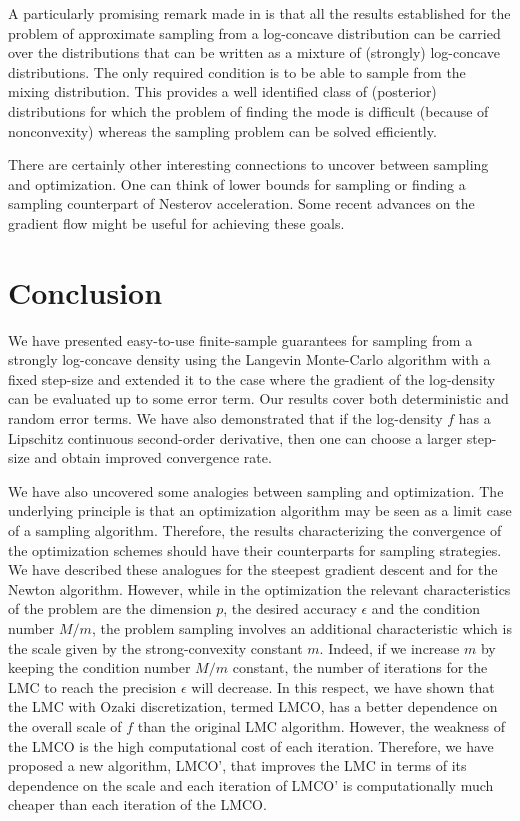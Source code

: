 \documentclass[aoap,preprint,reqno,a4paper]{imsart} %
\newcommand{\eps}{\epsilon}
\begin{document}
A particularly promising remark made in  is that all the results
established for the problem of approximate sampling from a log-concave distribution
can be carried over the distributions that can be written as a mixture of (strongly)
log-concave distributions. The only required condition is to be able to sample from
the mixing distribution. This provides a well identified class of (posterior)
distributions for which the problem of finding the mode is difficult (because of
nonconvexity) whereas the sampling problem can be solved efficiently.

There are certainly other interesting connections to uncover between sampling and
optimization. One can think of lower bounds for sampling or finding a sampling counterpart
of Nesterov acceleration. Some recent advances on the gradient flow 
might be useful for achieving these goals.

\section{Conclusion}

We have presented easy-to-use finite-sample guarantees for sampling from a strongly log-concave
density using the Langevin Monte-Carlo algorithm with a fixed step-size and extended it to the
case where the gradient of the log-density can be evaluated up to some error term. Our results cover
both deterministic and random error terms. We have also demonstrated that if the log-density $f$ has
a Lipschitz continuous second-order derivative, then one can choose a larger step-size and obtain
improved convergence rate.

We have also uncovered some analogies between sampling and optimization. The underlying principle
is that an optimization algorithm may be seen as a limit case of a sampling algorithm. Therefore,
the results characterizing the convergence of the optimization schemes should have their counterparts
for sampling strategies. We have described these analogues for the steepest gradient descent and for
the Newton algorithm. However, while in the optimization the relevant characteristics of the problem
are the dimension $p$, the desired accuracy $\eps$ and the condition number $M/m$, the problem sampling
involves an additional characteristic which is the scale given by the strong-convexity constant $m$. Indeed,
if we increase $m$ by keeping the condition number $M/m$ constant, the number of iterations for the LMC to
reach the precision $\epsilon$ will decrease. In this respect, we have shown that the LMC with
Ozaki discretization, termed LMCO, has a better dependence on the overall scale of $f$ than the original
LMC algorithm. However, the weakness of the LMCO is the high computational cost of each iteration.
Therefore, we have proposed a new algorithm, LMCO', that improves the LMC in terms of its dependence on the scale
and each iteration of LMCO' is computationally much cheaper than each iteration of the LMCO.
\end{document}
